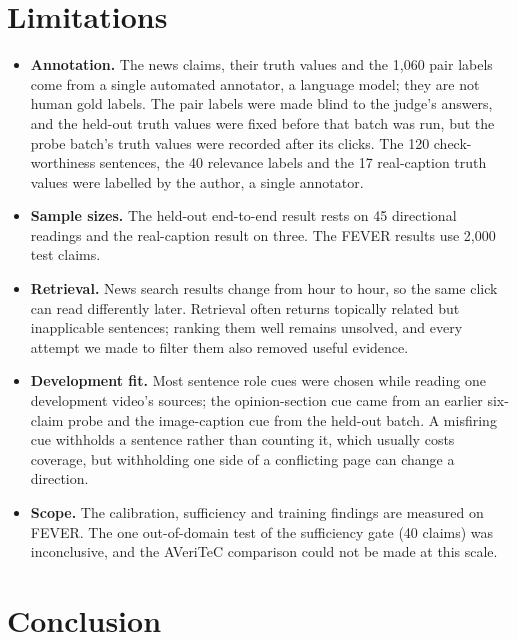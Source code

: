 \documentclass[11pt]{article}
\begin{document}
\section{Limitations}

\begin{itemize}
  \item \textbf{Annotation.} The news claims, their truth values and the 1,060 pair labels come from a single
        automated annotator, a language model; they are not human gold labels. The pair labels were made
        blind to the judge's answers, and the held-out truth values were fixed before that batch was run,
        but the probe batch's truth values were recorded after its clicks. The 120 check-worthiness
        sentences, the 40 relevance labels and the 17 real-caption truth values were labelled by the author,
        a single annotator.
  \item \textbf{Sample sizes.} The held-out end-to-end result rests on 45 directional readings and the
        real-caption result on three. The FEVER results use 2,000 test claims.
  \item \textbf{Retrieval.} News search results change from hour to hour, so the same click can read
        differently later. Retrieval often returns topically related but inapplicable sentences; ranking them
        well remains unsolved, and every attempt we made to filter them also removed useful evidence.
  \item \textbf{Development fit.} Most sentence role cues were chosen while reading one development video's
        sources; the opinion-section cue came from an earlier six-claim probe and the image-caption cue from
        the held-out batch. A misfiring cue withholds a sentence rather than counting it, which usually costs
        coverage, but withholding one side of a conflicting page can change a direction.
  \item \textbf{Scope.} The calibration, sufficiency and training findings are measured on FEVER. The one
        out-of-domain test of the sufficiency gate (40 claims) was inconclusive, and the AVeriTeC comparison
        could not be made at this scale.
\end{itemize}

\section{Conclusion}
\end{document}
